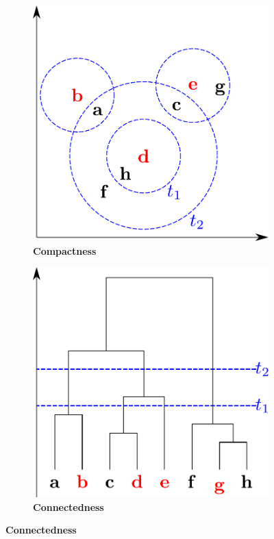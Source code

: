 \begin{figure}
    \centering
    \begin{adjustbox}{minipage=\dimexpr{}\fboxrule,fbox}
        \begin{subfigure}[b]{0.475\textwidth}
            \caption[Compactness]{\textbf{Compactness}}
            \label{subfig:Compactness}            \includegraphics[width=\textwidth]{Graphics/Compactness.pdf}
        \end{subfigure}
        \hfill
        \begin{subfigure}[b]{0.475\textwidth}
            \caption[Connectedness]{\textbf{Connectedness}}
            \label{subfig:Connectedness}            \includegraphics[width=\textwidth]{Graphics/Connectedness.pdf}

\end{subfigure}
\end{adjustbox}
\end{figure}
